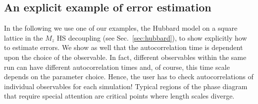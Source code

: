 %
\subsection{An explicit example of error estimation}\label{sec:autocorr}
%
In the following we use one of our examples, the Hubbard model on a square lattice in the $M_z$ HS decoupling (see Sec.~\ref{sec:hubbard}), to show explicitly how to estimate errors.  We show as well that the  autocorrelation time is dependent upon the  choice of the observable.  In fact, different observables within the same run can have different autocorrelation times and, of course, this time scale depends on the  parameter choice.  Hence, the user has to check  autocorrelations of individual observables for each simulation!  Typical regions of the phase diagram that require special attention are critical points  where length scales diverge.  

